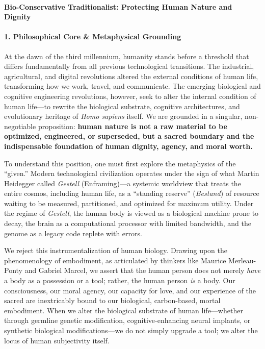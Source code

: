 \paragraph{Bio-Conservative Traditionalist: Protecting Human Nature and
Dignity}\label{bio-conservative-traditionalist-protecting-human-nature-and-dignity}

\paragraph{1. Philosophical Core \& Metaphysical
Grounding}\label{philosophical-core-metaphysical-grounding-33}

At the dawn of the third millennium, humanity stands before a threshold
that differs fundamentally from all previous technological transitions.
The industrial, agricultural, and digital revolutions altered the
external conditions of human life, transforming how we work, travel, and
communicate. The emerging biological and cognitive engineering
revolutions, however, seek to alter the internal condition of human
life---to rewrite the biological substrate, cognitive architectures, and
evolutionary heritage of \emph{Homo sapiens} itself. We are grounded in
a singular, non-negotiable proposition: \textbf{human nature is not a
raw material to be optimized, engineered, or superseded, but a sacred
boundary and the indispensable foundation of human dignity, agency, and
moral worth.}

To understand this position, one must first explore the metaphysics of
the ``given.'' Modern technological civilization operates under the sign
of what Martin Heidegger called \emph{Gestell} (Enframing)---a systemic
worldview that treats the entire cosmos, including human life, as a
``standing reserve'' (\emph{Bestand}) of resource waiting to be
measured, partitioned, and optimized for maximum utility. Under the
regime of \emph{Gestell}, the human body is viewed as a biological
machine prone to decay, the brain as a computational processor with
limited bandwidth, and the genome as a legacy code replete with errors.

We reject this instrumentalization of human biology. Drawing upon the
phenomenology of embodiment, as articulated by thinkers like Maurice
Merleau-Ponty and Gabriel Marcel, we assert that the human person does
not merely \emph{have} a body as a possession or a tool; rather, the
human person \emph{is} a body. Our consciousness, our moral agency, our
capacity for love, and our experience of the sacred are inextricably
bound to our biological, carbon-based, mortal embodiment. When we alter
the biological substrate of human life---whether through germline
genetic modification, cognitive-enhancing neural implants, or synthetic
biological modifications---we do not simply upgrade a tool; we alter the
locus of human subjectivity itself.

